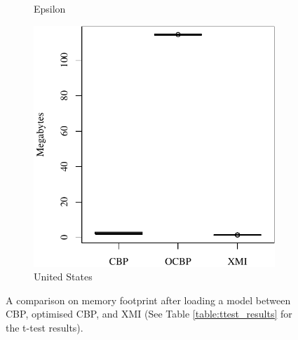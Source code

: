 \documentclass{llncs}
\begin{document}
\begin{figure}[ht]
\begin{subfigure}{0.325\textwidth}
    \caption{Epsilon}
    \label{fig:load_memory_epsilon}
\end{subfigure}
\hfill
\begin{subfigure}{0.325\textwidth}
    \centering
    \includegraphics[width=\linewidth]{images/load_memory_wikipedia}
    \caption{United States}
    \label{fig:load_memory_wikipedia}
\end{subfigure}
\caption{A comparison on memory footprint after loading a model between CBP, optimised CBP, and XMI (See Table \ref{table:ttest_results} for the t-test results).}
\label{fig:loadmemory}
    \end{figure}
    
\end{document}
